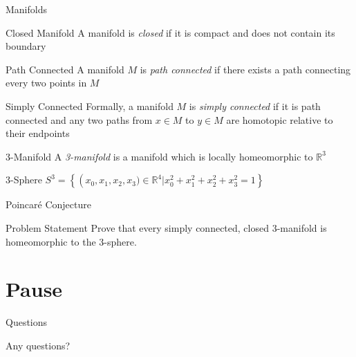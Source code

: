\documentclass{beamer}
\newcommand{\Poincare}{Poincar\'{e}}
\newcommand{\Real}{\mathbb{R}}
\begin{document}
  \begin{frame}{Manifolds}
      \linespread{0.8}
      \pause
      \begin{block}{Closed Manifold}
          A manifold is \textit{closed} if it is compact and does not contain
          its boundary
      \end{block}
      \pause
      \begin{block}{Path Connected}
          A manifold $M$ is \textit{path connected} if there exists a path
          connecting every two points in $M$
      \end{block}
      \pause
      \begin{block}{Simply Connected}
          Formally, a manifold $M$ is \textit{simply connected} if it is path
          connected and any two paths from $x \in M$ to $y \in M$ are
          homotopic relative to their endpoints
      \end{block}
      \pause
      \begin{block}{3-Manifold}
          A \textit{3-manifold} is a manifold which is locally homeomorphic to
          $\Real^3$
      \end{block}
      \pause
      \begin{block}{3-Sphere}
          $S^3 = \left\{\left(x_0, x_1, x_2, x_3) \in \Real^4 | x_0^2 + x_1^2 + x_2^2 +
          x_3^2 = 1\right\}$
      \end{block}
  \end{frame}
  \begin{frame}{\Poincare{} Conjecture}
      \begin{block}{Problem Statement}
          Prove that every simply connected, closed 3-manifold is
          homeomorphic to the 3-sphere.
      \end{block}
  \end{frame}

  \section{Pause}
  \begin{frame}{Questions}
      \begin{block}{}
          Any questions?
      \end{block}
  \end{frame}
\end{document}
